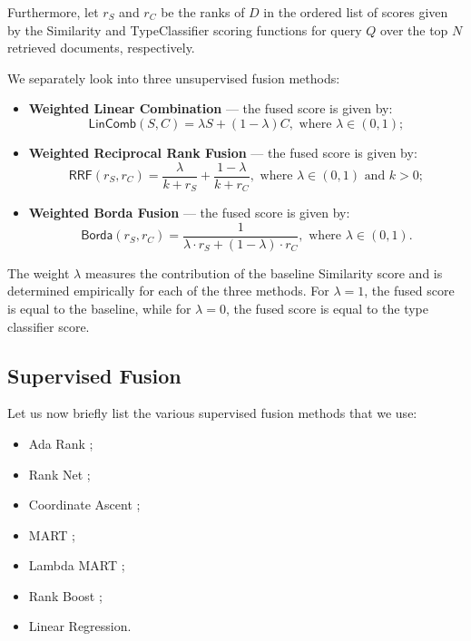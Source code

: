 Furthermore, let $r_S$ and $r_C$ be the ranks of $D$ in the ordered list of scores given by the
\textsf{Similarity} and \textsf{TypeClassifier} scoring functions for query $Q$ over the top $N$ retrieved documents,
respectively.

We separately look into three unsupervised fusion methods:
\begin{itemize}

 \item \textbf{Weighted Linear Combination} --- the fused score is given by: 
 \begin{equation} \label{interp-formula}
 \textsf{LinComb}(S, C) = \lambda S + (1-\lambda) C, \text{ where } \lambda \in (0,1);
 \end{equation}

\item \textbf{Weighted Reciprocal Rank Fusion} \cite{rrf} --- the fused score is given by:
 \begin{equation}\label{rrf-formula}
  \textsf{RRF}(r_S, r_C) =  \displaystyle\frac{\lambda}{k + r_S} + \displaystyle\frac{1- \lambda}{k + r_C},  \text{ where } \lambda \in (0,1)
  \text{ and } k>0;
 \end{equation}
 
 \item \textbf{Weighted Borda Fusion} \cite{borda} ---  the fused score is given by:
 \begin{equation}\label{borda-formula}
   \textsf{Borda}(r_S, r_C) =  \displaystyle\frac{1}{\lambda \cdot r_S + (1-\lambda)\cdot r_C},  \text{ where } \lambda \in (0,1).
 \end{equation}
  \end{itemize}

The weight $\lambda$ measures the contribution of the baseline \textsf{Similarity} score and
is determined empirically for each of the three methods. For $\lambda=1$, the fused score is equal to the baseline,
while for $\lambda=0$, the fused score is equal to the type classifier score.

\subsection{Supervised Fusion}\label{sup-fusion}
Let us now briefly list the various supervised fusion methods that we use:
\begin{itemize}
 \item {Ada Rank} \cite{adaRank};
 \item {Rank Net} \cite{rankNet};
 \item {Coordinate Ascent} \cite{coordAscent};
 \item {MART} \cite{mart};
 \item {Lambda MART} \cite{lambda-mart};
 \item {Rank Boost} \cite{rankBoost};
  \item {Linear Regression}.
\end{itemize}

